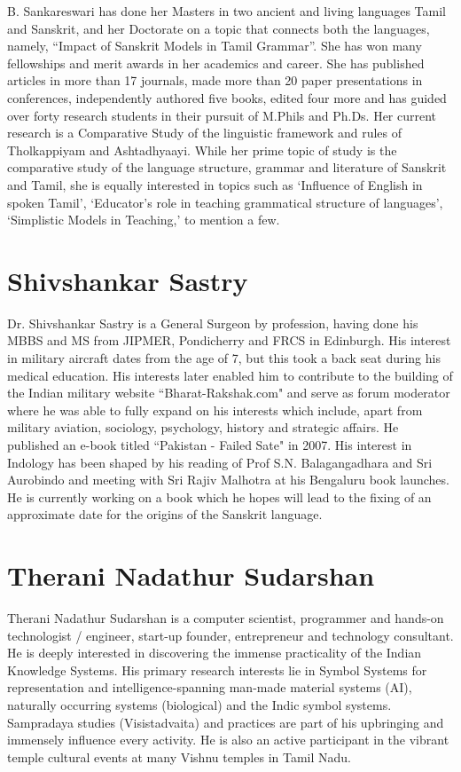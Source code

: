 B. Sankareswari has done her Masters in two ancient and living languages Tamil and Sanskrit, and her Doctorate on a topic that connects both the languages, namely, “Impact of Sanskrit Models in Tamil Grammar”. She has won many fellowships and merit awards in her academics and career. She has published articles in more than 17 journals, made more than 20 paper presentations in conferences, independently authored five books, edited four more and has guided over forty research students in their pursuit of M.Phils and Ph.Ds. Her current research is a Comparative Study of the linguistic framework and rules of Tholkappiyam and Ashtadhyaayi. While her prime topic of study is the comparative study of the language structure, grammar and literature of Sanskrit and Tamil, she is equally interested in topics such as ‘Influence of English in spoken Tamil’, ‘Educator’s role in teaching grammatical structure of languages’, ‘Simplistic Models in Teaching,’ to mention a few.

\section*{Shivshankar Sastry}

Dr. Shivshankar Sastry is a General Surgeon by profession, having done his MBBS and MS from JIPMER, Pondicherry and FRCS in Edinburgh. His interest in military aircraft dates from the age of 7, but this took a back seat during his medical education. His interests later enabled him to contribute to the building of the Indian military website “Bharat-Rakshak.com" and serve as forum moderator where he was able to fully expand on his interests which include, apart from military aviation, sociology, psychology, history and strategic affairs. He published an e-book titled “Pakistan - Failed Sate" in 2007. His interest in Indology has been shaped by his reading of Prof S.N. Balagangadhara and Sri Aurobindo and meeting with Sri Rajiv Malhotra at his Bengaluru book launches. He is currently working on a book which he hopes will lead to the fixing of an approximate date for the origins of the Sanskrit language.

\section*{Therani Nadathur Sudarshan}

Therani Nadathur Sudarshan is a computer scientist, programmer and hands-on technologist / engineer, start-up founder, entrepreneur and technology consultant. He is deeply interested in discovering the immense practicality of the Indian Knowledge Systems. His primary\break
 research interests lie in Symbol Systems for representation and\break
 intelligence-spanning man-made material systems (AI), naturally occurring systems (biological) and the Indic symbol systems. Sampradaya studies (Visistadvaita) and practices are part of his upbringing and immensely influence every activity. He is also an active participant in the vibrant temple cultural events at many Vishnu temples in Tamil Nadu.

